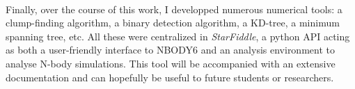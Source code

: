 \paragraph*{}
Finally, over the course of this work, I developped numerous numerical tools: a clump-finding algorithm, a binary detection algorithm, a KD-tree, a minimum spanning tree, etc. All these were centralized in \textit{StarFiddle}, a python API acting as both a user-friendly interface to NBODY6 and an analysis environment to analyse N-body simulations. This tool will be accompanied with an extensive documentation and can hopefully be useful to future students or researchers.






%
%
%
%
%
%
%
